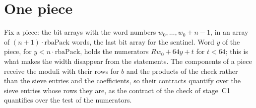 \section{One piece}\label{sec:piece}

Fix a piece: the bit arrays with the word numbers $w_0, \dots, w_0 + n - 1$, in an array of
$(n + 1) \cdot \mathrm{rbaPack}$ words, the last bit array for the sentinel. Word $y$ of the piece,
for $y < n \cdot \mathrm{rbaPack}$, holds the numerators $R w_0 + 64 y + t$ for $t < 64$; this is
what makes the width disappear from the statements. The components of a piece receive the moduli
with their rows for $b$ and the products of the check rather than the sieve entries and the
coefficients, so their contracts quantify over the sieve entries whose rows they are, as the
contract of the check of stage~C1 quantifies over the test of the numerators.

